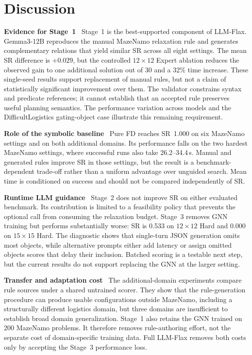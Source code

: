 \documentclass{ieeeaccess}
\newcommand{\myparagraph}[1]{\noindent\textbf{#1}~}
\newcommand{\method}{LLM-Flax\xspace}
\newcommand{\fullmethod}{Full LLM-Flax\xspace}
\begin{document}
\section{Discussion}
\label{sec:discussion}

\myparagraph{Evidence for Stage~1}
Stage~1 is the best-supported component of \method. Gemma3-12B reproduces the manual MazeNamo relaxation rule and generates complementary relations that yield similar SR across all eight settings. The mean SR difference is $+0.029$, but the controlled $12{\times}12$ Expert ablation reduces the observed gain to one additional solution out of 30 and a 32\% time increase. These single-seed results support replacement of manual rules, but not a claim of statistically significant improvement over them.
The validator constrains syntax and predicate references; it cannot establish that an accepted rule preserves useful planning semantics. The performance variation across models and the DifficultLogistics gating-object case illustrate this remaining requirement.

\myparagraph{Role of the symbolic baseline}
Pure FD reaches SR~1.000 on six MazeNamo settings and on both additional domains. Its performance falls on the two hardest MazeNamo settings, where successful runs also take 26.2--34.4\,s. Manual and generated rules improve SR in those settings, but the result is a benchmark-dependent trade-off rather than a uniform advantage over unguided search. Mean time is conditioned on success and should not be compared independently of SR.

\myparagraph{Runtime LLM guidance}
Stage~2 does not improve SR on either evaluated benchmark. Its contribution is limited to a feasibility policy that prevents the optional call from consuming the relaxation budget.
Stage~3 removes GNN training but performs substantially worse: SR is 0.533 on $12{\times}12$ Hard and 0.000 on $15{\times}15$ Hard. The diagnostic shows that single-turn JSON generation omits most objects, while alternative prompts either add latency or assign omitted objects scores that delay their inclusion. Batched scoring is a testable next step, but the current results do not support replacing the GNN at the larger setting.

\myparagraph{Transfer and adaptation cost}
The additional-domain experiments compare rule sources under a shared untrained scorer. They show that the rule-generation procedure can produce usable configurations outside MazeNamo, including a structurally different logistics domain, but three domains are insufficient to establish broad domain generalization.
Stage~1 also retains the GNN trained on 200 MazeNamo problems. It therefore removes rule-authoring effort, not the separate cost of domain-specific training data. \fullmethod removes both costs only by accepting the Stage~3 performance loss.
\end{document}
